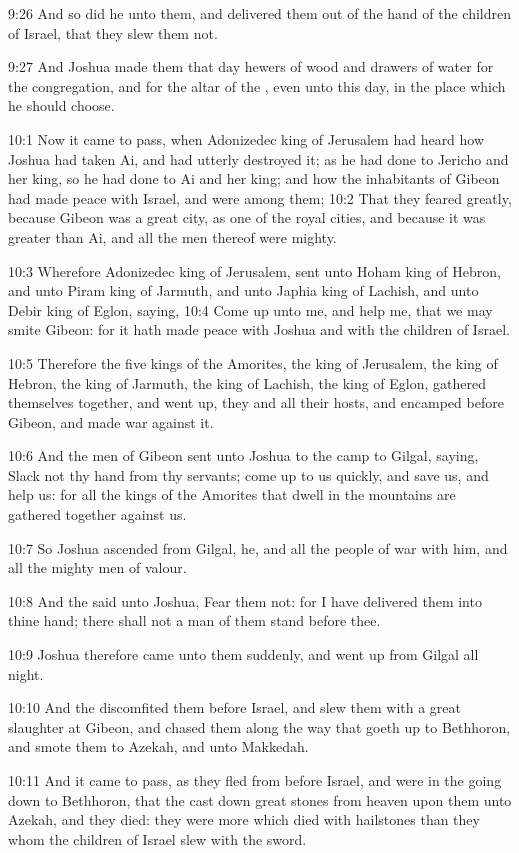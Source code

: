 9:26 And so did he unto them, and delivered them out of the hand of the children of Israel, that they slew them not.

9:27 And Joshua made them that day hewers of wood and drawers of water for the congregation, and for the altar of the \LORD, even unto this day, in the place which he should choose.

10:1 Now it came to pass, when Adonizedec king of Jerusalem had heard how Joshua had taken Ai, and had utterly destroyed it; as he had done to Jericho and her king, so he had done to Ai and her king; and how the inhabitants of Gibeon had made peace with Israel, and were among them; 10:2 That they feared greatly, because Gibeon was a great city, as one of the royal cities, and because it was greater than Ai, and all the men thereof were mighty.

10:3 Wherefore Adonizedec king of Jerusalem, sent unto Hoham king of Hebron, and unto Piram king of Jarmuth, and unto Japhia king of Lachish, and unto Debir king of Eglon, saying, 10:4 Come up unto me, and help me, that we may smite Gibeon: for it hath made peace with Joshua and with the children of Israel.

10:5 Therefore the five kings of the Amorites, the king of Jerusalem, the king of Hebron, the king of Jarmuth, the king of Lachish, the king of Eglon, gathered themselves together, and went up, they and all their hosts, and encamped before Gibeon, and made war against it.

10:6 And the men of Gibeon sent unto Joshua to the camp to Gilgal, saying, Slack not thy hand from thy servants; come up to us quickly, and save us, and help us: for all the kings of the Amorites that dwell in the mountains are gathered together against us.

10:7 So Joshua ascended from Gilgal, he, and all the people of war with him, and all the mighty men of valour.

10:8 And the \LORD said unto Joshua, Fear them not: for I have delivered them into thine hand; there shall not a man of them stand before thee.

10:9 Joshua therefore came unto them suddenly, and went up from Gilgal all night.

10:10 And the \LORD discomfited them before Israel, and slew them with a great slaughter at Gibeon, and chased them along the way that goeth up to Bethhoron, and smote them to Azekah, and unto Makkedah.

10:11 And it came to pass, as they fled from before Israel, and were in the going down to Bethhoron, that the \LORD cast down great stones from heaven upon them unto Azekah, and they died: they were more which died with hailstones than they whom the children of Israel slew with the sword.


